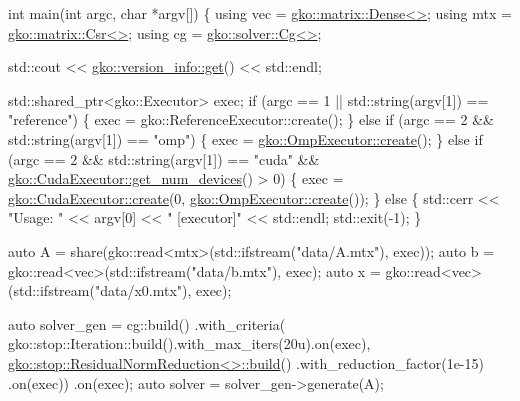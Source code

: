 \begin{DoxyCodeInclude}
\textcolor{keywordtype}{int} main(\textcolor{keywordtype}{int} argc, \textcolor{keywordtype}{char} *argv[])
\{
    \textcolor{keyword}{using} vec = \hyperlink{classgko_1_1matrix_1_1Dense}{gko::matrix::Dense<>};
    \textcolor{keyword}{using} mtx = \hyperlink{classgko_1_1matrix_1_1Csr}{gko::matrix::Csr<>};
    \textcolor{keyword}{using} cg = \hyperlink{classgko_1_1solver_1_1Cg}{gko::solver::Cg<>};

    std::cout << \hyperlink{classgko_1_1version__info_a6daeb8a087cfb57fa055526fc133d8eb}{gko::version\_info::get}() << std::endl;

    std::shared\_ptr<gko::Executor> exec;
    \textcolor{keywordflow}{if} (argc == 1 || std::string(argv[1]) == \textcolor{stringliteral}{"reference"}) \{
        exec = gko::ReferenceExecutor::create();
    \} \textcolor{keywordflow}{else} \textcolor{keywordflow}{if} (argc == 2 && std::string(argv[1]) == \textcolor{stringliteral}{"omp"}) \{
        exec = \hyperlink{classgko_1_1OmpExecutor_a33ca05fdd0fc928ee262fc9425304874}{gko::OmpExecutor::create}();
    \} \textcolor{keywordflow}{else} \textcolor{keywordflow}{if} (argc == 2 && std::string(argv[1]) == \textcolor{stringliteral}{"cuda"} &&
               \hyperlink{classgko_1_1CudaExecutor_aef0258494d14de0e56149b920c5173e5}{gko::CudaExecutor::get\_num\_devices}() > 0) \{
        exec = \hyperlink{classgko_1_1CudaExecutor_a2718a92034350650ef406ffdb60db090}{gko::CudaExecutor::create}(0, 
      \hyperlink{classgko_1_1OmpExecutor_a33ca05fdd0fc928ee262fc9425304874}{gko::OmpExecutor::create}());
    \} \textcolor{keywordflow}{else} \{
        std::cerr << \textcolor{stringliteral}{"Usage: "} << argv[0] << \textcolor{stringliteral}{" [executor]"} << std::endl;
        std::exit(-1);
    \}

    \textcolor{keyword}{auto} A = share(gko::read<mtx>(std::ifstream(\textcolor{stringliteral}{"data/A.mtx"}), exec));
    \textcolor{keyword}{auto} b = gko::read<vec>(std::ifstream(\textcolor{stringliteral}{"data/b.mtx"}), exec);
    \textcolor{keyword}{auto} x = gko::read<vec>(std::ifstream(\textcolor{stringliteral}{"data/x0.mtx"}), exec);

    \textcolor{keyword}{auto} solver\_gen =
        cg::build()
            .with\_criteria(
                gko::stop::Iteration::build().with\_max\_iters(20u).on(exec),
                \hyperlink{classgko_1_1stop_1_1ResidualNormReduction}{gko::stop::ResidualNormReduction<>::build}()
                    .with\_reduction\_factor(1e-15)
                    .on(exec))
            .on(exec);
    \textcolor{keyword}{auto} solver = solver\_gen->generate(A);


\end{DoxyCodeInclude}
